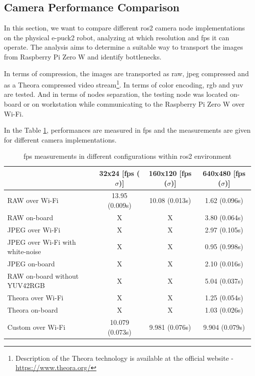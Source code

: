 \subsection{Camera Performance Comparison}
In this section, we want to compare different \ac{ros2} camera node implementations on the physical e-puck2 robot, analyzing at which resolution and \ac{fps} it can operate.
The analysis aims to determine a suitable way to transport the images from Raspberry Pi Zero W and identify bottlenecks.

In terms of compression, the images are transported as raw, \ac{jpeg} compressed and as a Theora compressed video stream\footnote{Description of the Theora technology is available at the official website - \url{https://www.theora.org/}}.
In terms of color encoding, \ac{rgb} and \acs{yuv} are tested.
And in terms of nodes separation, the testing node was located on-board or on workstation while communicating to the Raspberry Pi Zero W over Wi-Fi.

In the Table \ref{tab:results:camera_perf}, performances are measured in \ac{fps} and the measurements are given for different camera implementations.

\begin{table}[H]
    \begin{adjustwidth}{-1.5in}{-1.5in} 
    \centering
    \begin{tabular}{|l|c|c|c|}
        \hline
         & 32x24 [\ac{fps} ($ \sigma $)] & 160x120 [\ac{fps} ($ \sigma $)] & 640x480 [\ac{fps} ($ \sigma $)] \\
         \hline
         RAW over Wi-Fi & 13.95 (0.009s) & 10.08 (0.013s) & 1.62 (0.096s) \\
         \hline
         RAW on-board & X & X & 3.80 (0.064s) \\
        \hline
        JPEG over Wi-Fi & X & X & 2.97 (0.105s) \\
        \hline
        JPEG over Wi-Fi with white-noise & X & X & 0.95 (0.998s) \\
        \hline
        JPEG on-board & X & X & 2.10 (0.016s) \\
        \hline
        RAW on-board without YUV42RGB & X & X & 5.04 (0.037s) \\
        \hline
        Theora over Wi-Fi & X & X & 1.25 (0.054s) \\
        \hline
        Theora on-board & X & X & 1.03 (0.026s) \\
        \hline
        Custom over Wi-Fi & 10.079 (0.073s) & 9.981 (0.076s) & 9.904 (0.079s) \\
        \hline
    \end{tabular}
    \end{adjustwidth}
    
    \caption{\ac{fps} measurements in different configurations within \ac{ros2} environment}
    \label{tab:results:camera_perf}
\end{table}

